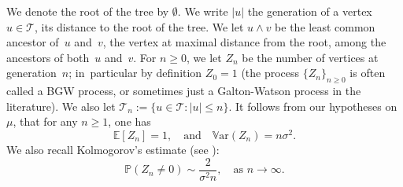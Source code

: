 We denote the root of the tree by $\emptyset$. We write $|u|$ the generation of a vertex $u\in \mathcal T$, \ie its distance to the root of the tree.
We let $u\wedge v$ be the least common ancestor of~$u$ and~$v$, \ie the vertex at maximal distance from the root, among the ancestors of
both~$u$ and~$v$. For $n\ge 0$, we let $Z_n$ be the number of vertices at generation~$n$; in~particular by definition $Z_0= 1$ (the process $\{Z_n\}_{n\ge 0}$ is often called a BGW process, or sometimes just a Galton-Watson process in the literature). We also let \hbox{$\mathcal T_n:=\{u\in \mathcal T:|u|\le n\}$}.
It follows from our hypotheses on $\mu$, that for any $n\ge 1$, one has
\begin{equation}\label{Zn}
\mathbb E[Z_n] = 1, \quad \text{and}\quad \mathbb V\text{ar}(Z_n) = n\sigma^2.
\end{equation}
We also recall Kolmogorov's estimate (see \cite[Th.\,1 p.\,19]{AN}):
\begin{equation}\label{Kol}
\mathbb P(Z_n\neq 0) \sim \frac{2}{\sigma^2 n }, \quad \text{as }n\to \infty.
\end{equation}

